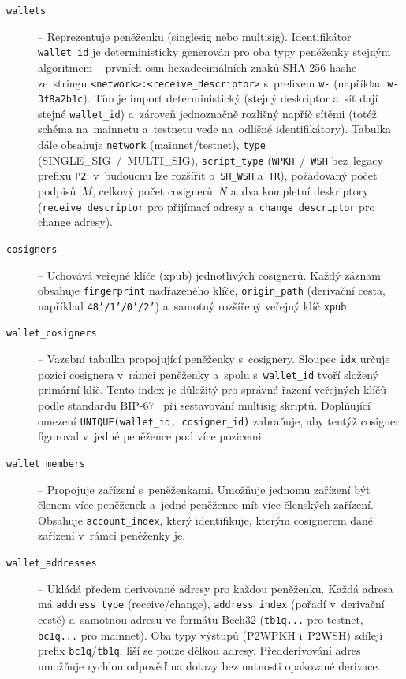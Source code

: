 \begin{description}
\item[\texttt{wallets}] {\sloppy -- Reprezentuje peněženku
  (singlesig nebo multisig). Identifikátor
  \texttt{wallet\_\allowbreak id} je deterministicky generován pro
  oba typy peněženky stejným algoritmem -- prvních osm hexadecimálních
  znaků SHA-256 hashe ze~stringu \texttt{<network>:<receive\_descriptor>}
  s~prefixem \texttt{w-} (například \texttt{w-3f8a2b1c}). Tím je import
  deterministický (stejný deskriptor a~síť dají stejné
  \texttt{wallet\_\allowbreak id}) a~zároveň jednoznačně rozlišný
  napříč sítěmi (totéž schéma na~mainnetu a~testnetu vede na~odlišné
  identifikátory). Tabulka dále obsahuje
  \texttt{network} (mainnet/\allowbreak testnet),
  \texttt{type} (SINGLE\_\allowbreak SIG~/~MULTI\_\allowbreak SIG),
  \texttt{script\_\allowbreak type} (\texttt{WPKH}~/~\texttt{WSH}
  bez~legacy prefixu \texttt{P2}; v~budoucnu lze rozšířit
  o~\texttt{SH\_WSH} a~\texttt{TR}), požadovaný počet podpisů~$M$,
  celkový počet cosignerů~$N$ a~dva kompletní deskriptory
  (\texttt{receive\_\allowbreak descriptor} pro přijímací
  adresy a~\texttt{change\_\allowbreak descriptor} pro change
  adresy).\par}

\item[\texttt{cosigners}] -- Uchovává veřejné klíče (xpub) jednotlivých
  cosignerů. Každý záznam obsahuje \texttt{fingerprint} nadřazeného klíče,
  \texttt{origin\_path} (derivační cesta, například \texttt{48'/1'/0'/2'})
  a~samotný rozšířený veřejný klíč \texttt{xpub}.

\item[\texttt{wallet\_cosigners}] -- Vazební tabulka propojující peněženky
  s~cosignery. Sloupec \texttt{idx} určuje pozici cosignera v~rámci
  peněženky a~spolu s~\texttt{wallet\_id} tvoří složený primární klíč.
  Tento index je důležitý pro správné řazení veřejných klíčů podle
  standardu BIP-67~\cite{BIP67} při sestavování multisig skriptů.
  Doplňující omezení \texttt{UNIQUE(wallet\_id, cosigner\_id)}
  zabraňuje, aby tentýž cosigner figuroval v~jedné peněžence
  pod více pozicemi.

\item[\texttt{wallet\_members}] -- Propojuje zařízení s~peněženkami.
  Umožňuje jednomu zařízení být členem více peněženek a~jedné peněžence
  mít více členských zařízení. Obsahuje \texttt{account\_index}, který
  identifikuje, kterým cosignerem dané zařízení v~rámci peněženky je.

\item[\texttt{wallet\_addresses}] -- Ukládá předem derivované adresy pro každou
  peněženku. Každá adresa má \texttt{address\_type} (receive/change),
  \texttt{address\_index} (pořadí v~derivační cestě) a~samotnou adresu ve formátu
  Bech32 (\texttt{tb1q...} pro testnet, \texttt{bc1q...} pro mainnet).
  Oba typy výstupů (P2WPKH i~P2WSH) sdílejí prefix \texttt{bc1q}/\texttt{tb1q},
  liší se pouze délkou adresy. Předderivování adres umožňuje rychlou odpověď na dotazy
  bez nutnosti opakované derivace.


\end{description}
